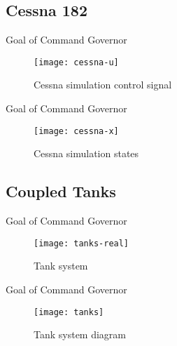\subsection{Cessna 182}%
\label{subsec:cessna}

\begin{slide}{Goal of Command Governor}
  \vspace*{\fill}
  \begin{figure}[ht!]
    \centering \captionsetup{justification=centering}
    \texttt{[image: cessna-u]}
    \caption{Cessna simulation control signal}%
    \label{fig:cessna-u}
  \end{figure}
  \vspace*{\fill}
\end{slide}

\begin{slide}{Goal of Command Governor}
  \vspace*{\fill}
  \begin{figure}[ht!]
    \centering \captionsetup{justification=centering}
    \texttt{[image: cessna-x]}
    \caption{Cessna simulation states}%
    \label{fig:cessna-x}
  \end{figure}
  \vspace*{\fill}
\end{slide}

\subsection{Coupled Tanks}%
\label{subsec:tanks}

\begin{slide}{Goal of Command Governor}
  \vspace*{\fill}
  \begin{figure}[ht!]
    \centering \captionsetup{justification=centering}
    \texttt{[image: tanks-real]}
    \caption{Tank system}%
    \label{fig:tanks-real}
  \end{figure}
  \vspace*{\fill}
\end{slide}

\begin{slide}{Goal of Command Governor}
  \vspace*{\fill}
  \begin{figure}[ht!]
    \centering \captionsetup{justification=centering}
    \texttt{[image: tanks]}
    \caption{Tank system diagram}%
    \label{fig:tanks}
  \end{figure}
  \vspace*{\fill}
\end{slide}

